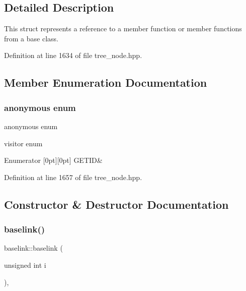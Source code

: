 \subsection{Detailed Description}
This struct represents a reference to a member function or member functions from a base class. 

Definition at line 1634 of file tree\+\_\+node.\+hpp.



\subsection{Member Enumeration Documentation}
\mbox{\label{structbaselink_a0373b0ef976520fa64c5b457b6e7e4cf}} 
\subsubsection{\texorpdfstring{anonymous enum}{anonymous enum}}
{\footnotesize\ttfamily anonymous enum}



visitor enum 

\begin{DoxyEnumFields}{Enumerator}
[0pt][0pt]{}\mbox{\label{structbaselink_a0373b0ef976520fa64c5b457b6e7e4cfac4e877b6bf52d8c0882f540524865811}} 
G\+E\+T\+ID&\\
\hline

\end{DoxyEnumFields}


Definition at line 1657 of file tree\+\_\+node.\+hpp.



\subsection{Constructor \& Destructor Documentation}
\mbox{\label{structbaselink_ac6d84294a809f3b0f3ab9fb7e8f0e34a}} 
\subsubsection{\texorpdfstring{baselink()}{baselink()}}
{\footnotesize\ttfamily baselink\+::baselink (\begin{DoxyParamCaption}\item[{unsigned int}]{i }\end{DoxyParamCaption})\hspace{0.3cm}{\ttfamily [inline]}, {\ttfamily [explicit]}}



